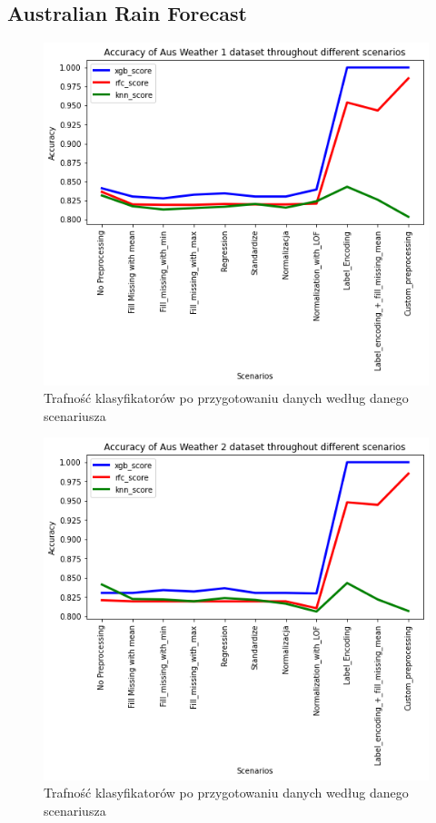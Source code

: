 \documentclass{article}
\begin{document}
\subsection{Australian Rain Forecast}

\begin{figure}[H]
\centerline{\includegraphics{Aus_Weather_1}}
\centering
\caption{Trafność klasyfikatorów po przygotowaniu danych według danego scenariusza}
\end{figure}
    
\begin{figure}[H]
\centerline{\includegraphics{Aus_Weather_2}}
\centering
\caption{Trafność klasyfikatorów po przygotowaniu danych według danego scenariusza}
\end{figure}
    
\end{document}
